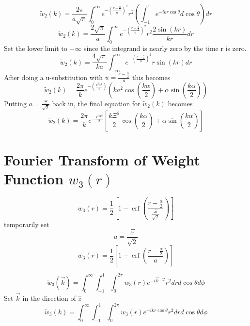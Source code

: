 \documentclass[double,12pt]{beavtex}
\begin{document}
\begin{equation}{\widetilde{w}_2(k)=\frac{2\pi}{a\sqrt{\pi}}\int_{0}^{\infty}e^{-\left(\frac{r-\frac{\alpha}{2}}{a}\right)^2}r^2\left(\int_{-1}^{1}e^{-ikr\cos\theta}d{\cos\theta}\right)d{r}}\end{equation}
\begin{equation}{\widetilde{w}_2(k)=\frac{2\sqrt{\pi}}{a}\int_{0}^{\infty}e^{-\left(\frac{r-\frac{\alpha}{2}}{a}\right)^2}r^2\frac{2\sin(kr)}{kr}d{r}}\end{equation}
Set the lower limit to $-\infty$  since the integrand is nearly zero by the time r is zero.
\begin{equation}{\widetilde{w}_2(k)=\frac{4\sqrt{\pi}}{ka}\int_{-\infty}^{\infty}e^{-\left(\frac{r-\frac{\alpha}{2}}{a}\right)^2}r\sin(kr)d{r}}\end{equation}
After doing a u-substitution with $u=\frac{r-\frac{\alpha}{2}}{a}$ this becomes
\begin{equation}{\widetilde{w}_2(k)=\frac{2\pi}{k}e^{-\left(\frac{k^2a^2}{4}\right)}\left(ka^2\cos\left(\frac{k\alpha}{2}\right)+\alpha\sin\left(\frac{k\alpha}{2}\right)\right)}\end{equation}
Putting $a=\frac{\Xi}{\sqrt{2}}$ back in, the final equation for $\widetilde{w}_2(k)$ becomes
\begin{equation}{\widetilde{w}_2(k)=\frac{2\pi}{k}e^{-\frac{k^2\Xi^2}{8}}\left[\frac{k\Xi^2}{2}\cos\left(\frac{k\alpha}{2}\right)+\alpha\sin\left(\frac{k\alpha}{2}\right)\right]}\end{equation}

\section{Fourier Transform of Weight Function $w_{3}(r)$}
\begin{equation}{w_3(r)=\frac{1}{2}\left[1-\operatorname{erf}\left(\frac{r-\frac{\alpha}{2}}{\frac{\Xi}{\sqrt{2}}}\right)\right]}\end{equation}
temporarily set 
\begin{equation}{a=\frac{\Xi}{\sqrt{2}}}\end{equation}
\begin{equation}{w_3(r)=\frac{1}{2}\left[1-\operatorname{erf}\left(\frac{r-\frac{\alpha}{2}}{a}\right)\right]}\end{equation}

\begin{equation}{\widetilde{w}_3(\vec{k})=\int_{0}^{\infty}\int_{-1}^{1}\int_{0}^{2\pi}w_3(r)e^{-i\vec{k}\cdot{\vec{r}}}r^2d{r}d{\cos\theta}d{\phi}}\end{equation}
Set $\vec{k}$ in the direction of $\hat{z}$ 
\begin{equation}{\widetilde{w}_3(k)=\int_{0}^{\infty}\int_{-1}^{1}\int_{0}^{2\pi}w_3(r)e^{-ikr\cos\theta}r^2d{r}d{\cos\theta}d{\phi}}\end{equation}
\end{document}
